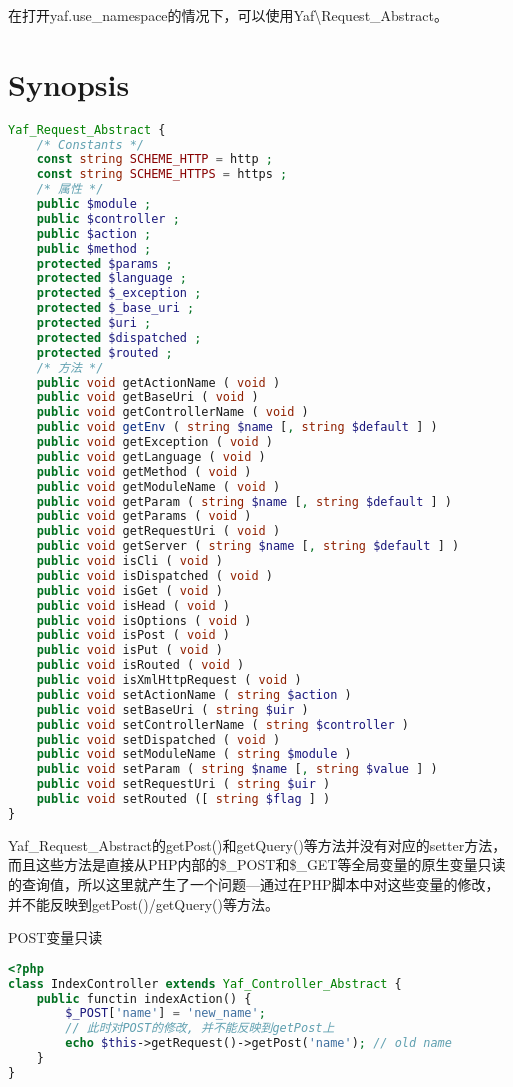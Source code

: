 在打开yaf.use\_namespace的情况下，可以使用Yaf\textbackslash Request\_Abstract。



\section{Synopsis}



\begin{lstlisting}[language=PHP]
Yaf_Request_Abstract {
    /* Constants */
    const string SCHEME_HTTP = http ;
    const string SCHEME_HTTPS = https ;
    /* 属性 */
    public $module ;
    public $controller ;
    public $action ;
    public $method ;
    protected $params ;
    protected $language ;
    protected $_exception ;
    protected $_base_uri ;
    protected $uri ;
    protected $dispatched ;
    protected $routed ;
    /* 方法 */
    public void getActionName ( void )
    public void getBaseUri ( void )
    public void getControllerName ( void )
    public void getEnv ( string $name [, string $default ] )
    public void getException ( void )
    public void getLanguage ( void )
    public void getMethod ( void )
    public void getModuleName ( void )
    public void getParam ( string $name [, string $default ] )
    public void getParams ( void )
    public void getRequestUri ( void )
    public void getServer ( string $name [, string $default ] )
    public void isCli ( void )
    public void isDispatched ( void )
    public void isGet ( void )
    public void isHead ( void )
    public void isOptions ( void )
    public void isPost ( void )
    public void isPut ( void )
    public void isRouted ( void )
    public void isXmlHttpRequest ( void )
    public void setActionName ( string $action )
    public void setBaseUri ( string $uir )
    public void setControllerName ( string $controller )
    public void setDispatched ( void )
    public void setModuleName ( string $module )
    public void setParam ( string $name [, string $value ] )
    public void setRequestUri ( string $uir )
    public void setRouted ([ string $flag ] )
}
\end{lstlisting}



Yaf\_Request\_Abstract的getPost()和getQuery()等方法并没有对应的setter方法，而且这些方法是直接从PHP内部的\$\_POST和\$\_GET等全局变量的原生变量只读的查询值，所以这里就产生了一个问题—通过在PHP脚本中对这些变量的修改，并不能反映到getPost()/getQuery()等方法。

\begin{example}
POST变量只读
\begin{lstlisting}[language=PHP]
<?php
class IndexController extends Yaf_Controller_Abstract {
    public functin indexAction() {
        $_POST['name'] = 'new_name';
        // 此时对POST的修改, 并不能反映到getPost上
        echo $this->getRequest()->getPost('name'); // old name
    }
}
\end{lstlisting}
\end{example}

